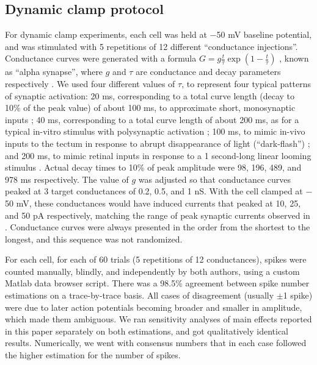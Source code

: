 \documentclass{article}
\begin{document}
\subsection*{Dynamic clamp protocol}

For dynamic clamp experiments, each cell was held at $-$50 mV baseline potential, and was stimulated with 5 repetitions of 12 different “conductance injections”. Conductance curves were generated with a formula $G=g\frac{t}{\tau}\exp(1-\frac{t}{\tau})$ , known as “alpha synapse”, where $g$ and $\tau$ are conductance and decay parameters respectively \citep{destexhe1994}. We used four different values of $\tau$, to represent four typical patterns of synaptic activation: 20 ms, corresponding to a total curve length (decay to 10\% of the peak value) of about 100 ms, to approximate short, monosynaptic inputs \citep{ciarleglio2015}; 40 ms, corresponding to a total curve length of about 200 ms, as for a typical in-vitro stimulus with polysynaptic activation \citep{xu2011}; 100 ms, to mimic in-vivo inputs to the tectum in response to abrupt disappearance of light (“dark-flash”) \citep{khakhalin2014}; and 200 ms, to mimic retinal inputs in response to a 1 second-long linear looming stimulus \citep{khakhalin2014}. Actual decay times to 10\% of peak amplitude were 98, 196, 489, and 978 ms respectively. The value of $g$ was adjusted so that conductance curves peaked at 3 target conductances of 0.2, 0.5, and 1 nS. With the cell clamped at $-$50 mV, these conductances would have induced currents that peaked at 10, 25, and 50 pA respectively, matching the range of peak synaptic currents observed in \citep{xu2011,khakhalin2014,ciarleglio2015}. Conductance curves were always presented in the order from the shortest to the longest, and this sequence was not randomized.

For each cell, for each of 60 trials (5 repetitions of 12 conductances), spikes were counted manually, blindly, and independently by both authors, using a custom Matlab data browser script. There was a 98.5\% agreement between spike number estimations on a trace-by-trace basis. All cases of disagreement (usually $\pm$1 spike) were due to later action potentials becoming broader and smaller in amplitude, which made them ambiguous. We ran sensitivity analyses of main effects reported in this paper separately on both estimations, and got qualitatively identical results. Numerically, we went with consensus numbers that in each case followed the higher estimation for the number of spikes.
\end{document}
